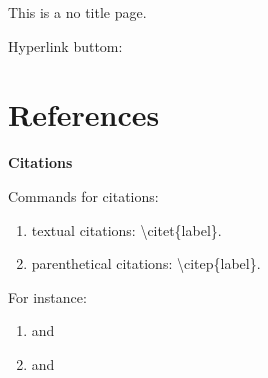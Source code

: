 \documentclass[12pt, aspectratio=169]{beamer}
\begin{document}

\begin{frame}

	This is a no title page.\\
	
	\bigskip
		
	Hyperlink buttom: \hyperlink{Link Text}{}
	
\end{frame}


\section{References}


\linespread{1}  
\begin{frame}{\textbf{Citations}}
\linespread{1.5} 

	Commands for citations:
	
	\begin{enumerate}[1]
		\item textual citations: \textbackslash citet\{label\}.
		\item parenthetical citations: \textbackslash citep\{label\}.
	\end{enumerate}
	
	\bigskip
	
	For instance:
	
	\begin{enumerate}[1]
		\item \citet{Non-CES} and \citet{Melitz (2003)}
		\item \citep{Non-CES} and \citep{Melitz (2003)}
	\end{enumerate}
	
\end{frame}

\end{document}
